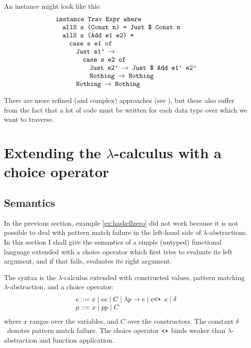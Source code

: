 \documentclass[fleqn]{article}
\newcommand{\ve}[1]{\ensuremath{\text{\tt #1}}}
\newcommand{\ra}{\ensuremath{\rightarrow} }
\newcommand{\lcalc}{$\lambda$-calculus }
\newcommand{\plus}{\ve{ <+ } }
\newcommand{\fail}{\ensuremath{\delta }}
\newcommand{\alt}{\ensuremath{\; | \;}}
\begin{document}
An instance might look like this:
\[
\begin{array}{l}
\ve{instance Trav Expr where} \\
\quad \ve{allS s (Const n) = Just \$ Const n} \\
\quad \ve{allS s (Add e1 e2) =} \\
\quad \quad \ve{case s e1 of} \\
\quad \quad \quad \ve{Just e1' \ra} \\
\quad \quad \quad \quad \ve{case s e2 of} \\
\quad \quad \quad \quad \quad \ve{Just e2' \ra Just \$ Add e1' e2'} \\
\quad \quad \quad \quad \quad \ve{Nothing \ra Nothing} \\
\quad \quad \quad \ve{Nothing \ra Nothing} 
\end{array}
\]

There are more refined (and complex) approaches (see
\cite{typesafefuncstrat}), but these also suffer from the fact that a
lot of code must be written for each data type over which we want to
traverse.


\section{Extending the \lcalc with a choice operator}
\label{sec:choice}

\subsection{Semantics}

In the previous section, example \ref{ex:haskellzero}
did not work because it is not
possible to deal with pattern match failure in the left-hand side of
$\lambda$-abstractions.  In this section I shall give the semantics of
a simple (untyped) functional language extended with a choice operator
which first tries to evaluate its left argument, and if that fails,
evaluates its right argument.

The syntax is the \lcalc extended with constructed
values, pattern matching $\lambda$-abstraction, and a choice operator:
\[
\begin{array}{l}
e ::= x \alt e e \alt C \alt \lambda p \ra e 
 \alt e \plus e \alt \fail\\
p ::= x \alt p p \alt C \\
\end{array}
\]
where $x$ ranges over the variables, and $C$ over the constructors.
The constant \fail\ denotes pattern match failure.  The choice
operator \ve{<+} binds weaker than $\lambda$-abstraction and function
application. 
\end{document}
